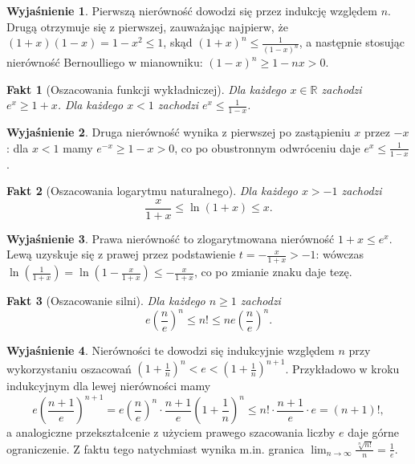 \documentclass[11pt, a4paper]{article}
\theoremstyle{plain}
\newtheorem{fakt}{Fakt}
\theoremstyle{definition}
\newtheorem*{wyjasnienie}{Wyjaśnienie}
\begin{document}
\begin{wyjasnienie}
Pierwszą nierówność dowodzi się przez indukcję względem $n$. Drugą otrzymuje się z pierwszej, zauważając najpierw, że $(1 + x)(1 - x) = 1 - x^2 \leqslant 1$, skąd $(1 + x)^n \leqslant \frac{1}{(1 - x)^n}$, a następnie stosując nierówność Bernoulliego w mianowniku: $(1 - x)^n \geqslant 1 - nx > 0$.
\end{wyjasnienie}

\begin{fakt}[Oszacowania funkcji wykładniczej]
Dla każdego $x \in \mathbb{R}$ zachodzi $e^x \geqslant 1 + x$. Dla każdego $x < 1$ zachodzi $e^x \leqslant \frac{1}{1 - x}$.
\end{fakt}

\begin{wyjasnienie}
Druga nierówność wynika z pierwszej po zastąpieniu $x$ przez $-x$: dla $x < 1$ mamy $e^{-x} \geqslant 1 - x > 0$, co po obustronnym odwróceniu daje $e^x \leqslant \frac{1}{1 - x}$.
\end{wyjasnienie}

\begin{fakt}[Oszacowania logarytmu naturalnego]
Dla każdego $x > -1$ zachodzi
\[
\frac{x}{1 + x} \leqslant \ln(1 + x) \leqslant x.
\]
\end{fakt}

\begin{wyjasnienie}
Prawa nierówność to zlogarytmowana nierówność $1 + x \leqslant e^x$. Lewą uzyskuje się z prawej przez podstawienie $t = -\frac{x}{1 + x} > -1$: wówczas $\ln\left(\frac{1}{1 + x}\right) = \ln\left(1 - \frac{x}{1 + x}\right) \leqslant -\frac{x}{1 + x}$, co po zmianie znaku daje tezę.
\end{wyjasnienie}

\begin{fakt}[Oszacowanie silni]
Dla każdego $n \geqslant 1$ zachodzi
\[
e\left(\frac{n}{e}\right)^n \leqslant n! \leqslant n e\left(\frac{n}{e}\right)^n.
\]
\end{fakt}

\begin{wyjasnienie}
Nierówności te dowodzi się indukcyjnie względem $n$ przy wykorzystaniu oszacowań $\left(1 + \frac{1}{n}\right)^n < e < \left(1 + \frac{1}{n}\right)^{n+1}$. Przykładowo w kroku indukcyjnym dla lewej nierówności mamy
\[
e\left(\frac{n+1}{e}\right)^{n+1} = e\left(\frac{n}{e}\right)^n \cdot \frac{n+1}{e}\left(1 + \frac{1}{n}\right)^n \leqslant n! \cdot \frac{n+1}{e} \cdot e = (n+1)!,
\]
a analogiczne przekształcenie z użyciem prawego szacowania liczby $e$ daje górne ograniczenie. Z faktu tego natychmiast wynika m.in. granica $\lim_{n\to\infty} \frac{\sqrt[n]{n!}}{n} = \frac{1}{e}$.
\end{wyjasnienie}
\end{document}
